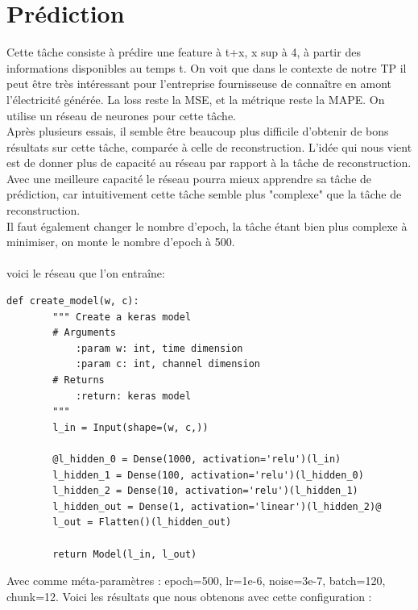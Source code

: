 \documentclass{article}
\begin{document}
\section{Prédiction}
Cette tâche consiste à prédire une feature à t+x, x sup à 4, à partir des informations disponibles au temps t. On voit que dans le contexte de notre TP il peut être très intéressant pour l'entreprise fournisseuse de connaître en amont l'électricité générée. La loss reste la MSE, et la métrique reste la MAPE. On utilise un réseau de neurones pour cette tâche.\\
Après plusieurs essais, il semble être beaucoup plus difficile d'obtenir de bons résultats sur cette tâche, comparée à celle de reconstruction. L'idée qui nous vient est de donner plus de capacité au réseau par rapport à la tâche de reconstruction. Avec une meilleure capacité le réseau pourra mieux apprendre sa tâche de prédiction, car intuitivement cette tâche semble plus "complexe" que la tâche de reconstruction.\\Il faut également changer le nombre d'epoch, la tâche étant bien plus complexe à minimiser, on monte le nombre d'epoch à 500.\\\\
voici le réseau que l'on entraîne:
\begin{lstlisting}[frame=single]
        def create_model(w, c):
        """ Create a keras model
        # Arguments
            :param w: int, time dimension
            :param c: int, channel dimension
        # Returns
            :return: keras model
        """
        l_in = Input(shape=(w, c,))  
        
        @l_hidden_0 = Dense(1000, activation='relu')(l_in)
        l_hidden_1 = Dense(100, activation='relu')(l_hidden_0)
        l_hidden_2 = Dense(10, activation='relu')(l_hidden_1)
        l_hidden_out = Dense(1, activation='linear')(l_hidden_2)@
        l_out = Flatten()(l_hidden_out)

        return Model(l_in, l_out)
    \end{lstlisting}
Avec comme méta-paramètres : epoch=500, lr=1e-6, noise=3e-7, batch=120, chunk=12.
Voici les résultats que nous obtenons avec cette configuration :
\end{document}
